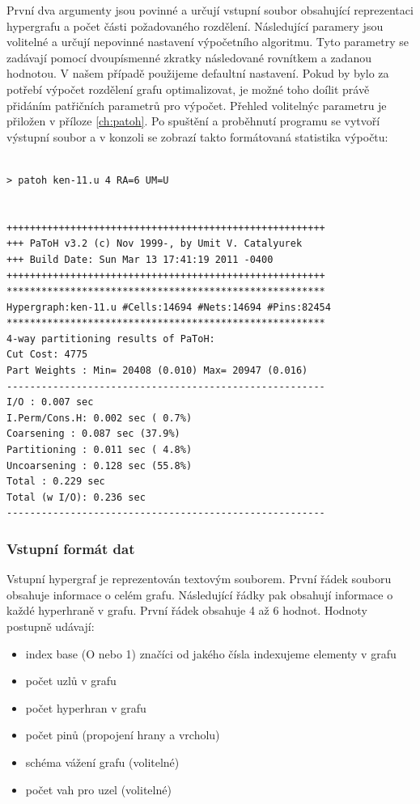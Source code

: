 \documentclass[thesis=M,czech]{FITthesis}[2012/06/26]
\begin{document}
První dva argumenty jsou povinné a určují vstupní soubor obsahující reprezentaci hypergrafu a počet části požadovaného rozdělení. Následující paramery jsou volitelné a určují nepovinné nastavení výpočetního algoritmu.  Tyto parametry se zadávají pomocí dvoupísmenné zkratky následované rovnítkem a zadanou hodnotou. V našem případě použijeme defaultní nastavení. Pokud by bylo za potřebí výpočet rozdělení grafu optimalizovat, je možné toho doílit právě přidáním patřičních parametrů pro výpočet. Přehled volitelnýc parametru je přiložen v příloze \ref{ch:patoh}. Po spuštění a proběhnutí programu se vytvoří výstupní soubor a v konzoli se zobrazí takto formátovaná statistika výpočtu:
\medskip
\begin{lstlisting}[frame=single]  % Start your code-block
 
> patoh ken-11.u 4 RA=6 UM=U 
 
 
+++++++++++++++++++++++++++++++++++++++++++++++++++++++
+++ PaToH v3.2 (c) Nov 1999-, by Umit V. Catalyurek
+++ Build Date: Sun Mar 13 17:41:19 2011 -0400
+++++++++++++++++++++++++++++++++++++++++++++++++++++++
*******************************************************
Hypergraph:ken-11.u #Cells:14694 #Nets:14694 #Pins:82454
*******************************************************
4-way partitioning results of PaToH:
Cut Cost: 4775
Part Weights : Min= 20408 (0.010) Max= 20947 (0.016)
-------------------------------------------------------
I/O : 0.007 sec
I.Perm/Cons.H: 0.002 sec ( 0.7%)
Coarsening : 0.087 sec (37.9%)
Partitioning : 0.011 sec ( 4.8%)
Uncoarsening : 0.128 sec (55.8%)
Total : 0.229 sec
Total (w I/O): 0.236 sec
-------------------------------------------------------

\end{lstlisting}
\medskip
\subsubsection{Vstupní formát dat}
Vstupní hypergraf je reprezentován textovým souborem. První řádek souboru obsahuje informace o celém grafu. Následující řádky pak obsahují informace o každé hyperhraně v grafu. První řádek obsahuje 4 až 6 hodnot. Hodnoty postupně udávají:
\begin{itemize}
\item index base (O nebo 1) značíci od jakého čísla indexujeme elementy v grafu
\item počet uzlů v grafu
\item počet hyperhran v grafu
\item počet pinů (propojení hrany a vrcholu)
\item schéma vážení grafu (volitelné)
\item počet vah pro uzel (volitelné)
\end{itemize}
\end{document}
